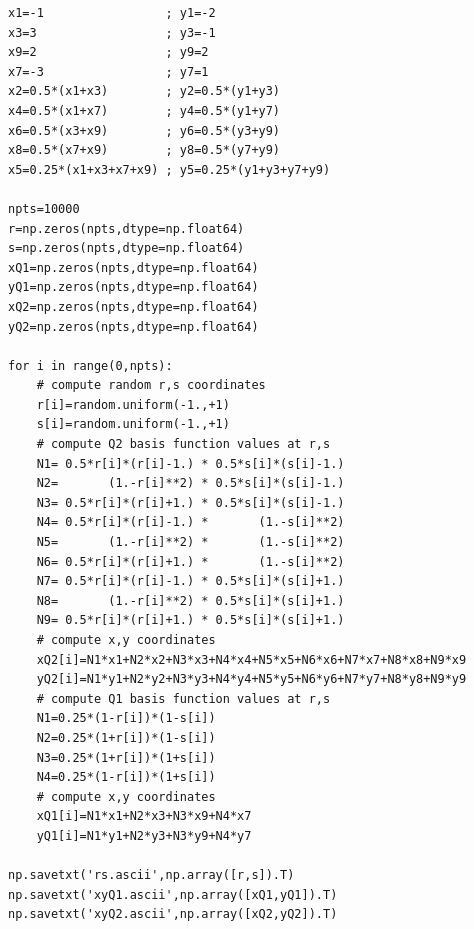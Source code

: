 \begin{lstlisting}
x1=-1                 ; y1=-2
x3=3                  ; y3=-1
x9=2                  ; y9=2
x7=-3                 ; y7=1
x2=0.5*(x1+x3)        ; y2=0.5*(y1+y3)
x4=0.5*(x1+x7)        ; y4=0.5*(y1+y7)
x6=0.5*(x3+x9)        ; y6=0.5*(y3+y9)
x8=0.5*(x7+x9)        ; y8=0.5*(y7+y9)
x5=0.25*(x1+x3+x7+x9) ; y5=0.25*(y1+y3+y7+y9)

npts=10000
r=np.zeros(npts,dtype=np.float64)   
s=np.zeros(npts,dtype=np.float64)   
xQ1=np.zeros(npts,dtype=np.float64)   
yQ1=np.zeros(npts,dtype=np.float64)   
xQ2=np.zeros(npts,dtype=np.float64)   
yQ2=np.zeros(npts,dtype=np.float64)   

for i in range(0,npts):
    # compute random r,s coordinates
    r[i]=random.uniform(-1.,+1)
    s[i]=random.uniform(-1.,+1)
    # compute Q2 basis function values at r,s
    N1= 0.5*r[i]*(r[i]-1.) * 0.5*s[i]*(s[i]-1.)
    N2=       (1.-r[i]**2) * 0.5*s[i]*(s[i]-1.)
    N3= 0.5*r[i]*(r[i]+1.) * 0.5*s[i]*(s[i]-1.)
    N4= 0.5*r[i]*(r[i]-1.) *       (1.-s[i]**2)
    N5=       (1.-r[i]**2) *       (1.-s[i]**2)
    N6= 0.5*r[i]*(r[i]+1.) *       (1.-s[i]**2)
    N7= 0.5*r[i]*(r[i]-1.) * 0.5*s[i]*(s[i]+1.)
    N8=       (1.-r[i]**2) * 0.5*s[i]*(s[i]+1.)
    N9= 0.5*r[i]*(r[i]+1.) * 0.5*s[i]*(s[i]+1.)
    # compute x,y coordinates
    xQ2[i]=N1*x1+N2*x2+N3*x3+N4*x4+N5*x5+N6*x6+N7*x7+N8*x8+N9*x9
    yQ2[i]=N1*y1+N2*y2+N3*y3+N4*y4+N5*y5+N6*y6+N7*y7+N8*y8+N9*y9
    # compute Q1 basis function values at r,s
    N1=0.25*(1-r[i])*(1-s[i])
    N2=0.25*(1+r[i])*(1-s[i])
    N3=0.25*(1+r[i])*(1+s[i])
    N4=0.25*(1-r[i])*(1+s[i])
    # compute x,y coordinates
    xQ1[i]=N1*x1+N2*x3+N3*x9+N4*x7
    yQ1[i]=N1*y1+N2*y3+N3*y9+N4*y7

np.savetxt('rs.ascii',np.array([r,s]).T)
np.savetxt('xyQ1.ascii',np.array([xQ1,yQ1]).T)
np.savetxt('xyQ2.ascii',np.array([xQ2,yQ2]).T)
\end{lstlisting}

